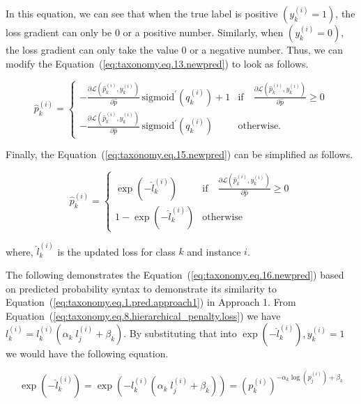In this equation, we can see that when the true label is positive $\left(y_k^{(i)}=1\right) $, the loss gradient can only be 0 or a positive number. Similarly, when $\left(y_k^{(i)}=0\right) $, the loss gradient can only take the value 0 or a negative number. Thus, we can modify the Equation~(\ref{eq:taxonomy.eq.13.newpred})  to look as follows.

\begin{equation}
    \label{eq:taxonomy.eq.15.newpred}
    \widehat{p}_k^{(i)} =
    \begin{cases}
        -\frac{\partial \mathcal{L}(\widehat{p}_k^{(i)}, y_k^{(i)})}{\partial \widehat{p}} \, \text{sigmoid}^{\prime}(q_k^{(i)}) + 1 & \text{if} \quad \frac{\partial \mathcal{L}(\widehat{p}_k^{(i)}, y_k^{(i)})}{\partial \widehat{p}} \geq 0 \\
        -\frac{\partial \mathcal{L}(\widehat{p}_k^{(i)}, y_k^{(i)})}{\partial \widehat{p}} \, \text{sigmoid}^{\prime}(q_k^{(i)}) & \text{otherwise.}
    \end{cases}
\end{equation}

Finally, the Equation~(\ref{eq:taxonomy.eq.15.newpred}) can be simplified as follows.



\begin{equation}
    \label{eq:taxonomy.eq.16.newpred}
    \widehat{p}_k^{(i)} =
    \begin{cases}
        \exp(-\widehat{l}_k^{(i)}) & \text{if} \quad \frac{\partial \mathcal{L}(\widehat{p}_k^{(i)}, y_k^{(i)})}{\partial \widehat{p}} \geq 0 \\
        1 - \exp(-\widehat{l}_k^{(i)}) & \text{otherwise}
    \end{cases}
\end{equation}

where, ${\widehat l}_k^{(i)} $ is the updated loss for class $k $ and instance $i $.

The following demonstrates the Equation~(\ref{eq:taxonomy.eq.16.newpred})  based on predicted probability syntax to demonstrate its similarity to Equation~(\ref{eq:taxonomy.eq.1.pred.approach1})  in Approach 1. From Equation~(\ref{eq:taxonomy.eq.8.hierarchical_penalty.loss}) we have $l_k^{(i)}=l_k^{(i)}\left(\alpha_k\;l_j^{(i)}+\beta_k\right) $. By substituting that into $\exp{\left(-\widehat{l}_{k}^{(i)}\right)}, y_{k}^{(i)}=1 $ we would have the following equation.


\begin{equation}
    \label{eq:taxonomy.eq.17}
    \exp{\left(-{\widehat l}_k^{(i)}\right)}=\exp{\left(-l_k^{(i)}\left(\alpha_k\;l_j^{(i)}+\beta_k\right)\right)}={\left(p_k^{(i)}\right)}^{-\alpha_k{\log{\left(p_j^{(i)}\right)}}+\beta_k}
\end{equation}


